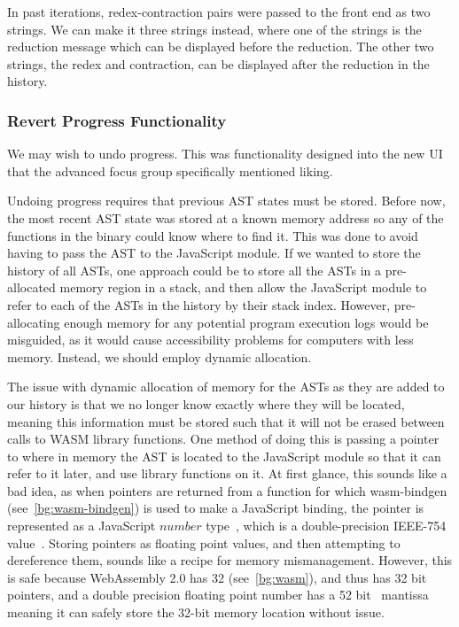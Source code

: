 In past iterations, redex-contraction pairs were passed to the front end as two strings. We can make it three strings instead, where one of the strings is the reduction message which can be displayed before the reduction. The other two strings, the redex and contraction, can be displayed after the reduction in the history. 

\subsubsection{Revert Progress Functionality}
We may wish to undo progress. This was functionality designed into the new UI that the advanced focus group specifically mentioned liking. 

Undoing progress requires that previous \ac{AST} states must be stored. Before now, the most recent \ac{AST} state was stored at a known memory address so any of the functions in the binary could know where to find it. This was done to avoid having to pass the \ac{AST} to the JavaScript module. If we wanted to store the history of all \ac{AST}s, one approach could be to store all the \ac{AST}s in a pre-allocated memory region in a stack, and then allow the JavaScript module to refer to each of the \ac{AST}s in the history by their stack index. However, pre-allocating enough memory for any potential program execution logs would be misguided, as it would cause accessibility problems for computers with less memory. Instead, we should employ dynamic allocation. 

The issue with dynamic allocation of memory for the \ac{AST}s as they are added to our history is that we no longer know exactly where they will be located, meaning this information must be stored such that it will not be erased between calls to \ac{WASM} library functions. One method of doing this is passing a pointer to where in memory the \ac{AST} is located to the JavaScript module so that it can refer to it later, and use library functions on it. At first glance, this sounds like a bad idea, as when pointers are returned from a function for which wasm-bindgen (see~\ref{bg:wasm-bindgen}) is used to make a JavaScript binding, the pointer is represented as a JavaScript $number$ type~\cite{wasm_bindgen_guide}, which is a double-precision IEEE-754 value~\cite{ecma262number}. Storing pointers as floating point values, and then attempting to dereference them, sounds like a recipe for memory mismanagement. However, this is safe because WebAssembly 2.0 has 32 (see~\ref{bg:wasm}), and thus has 32 bit pointers, and a double precision floating point number has a 52 bit~\cite{ieee754} mantissa meaning it can safely store the 32-bit memory location without issue. 

